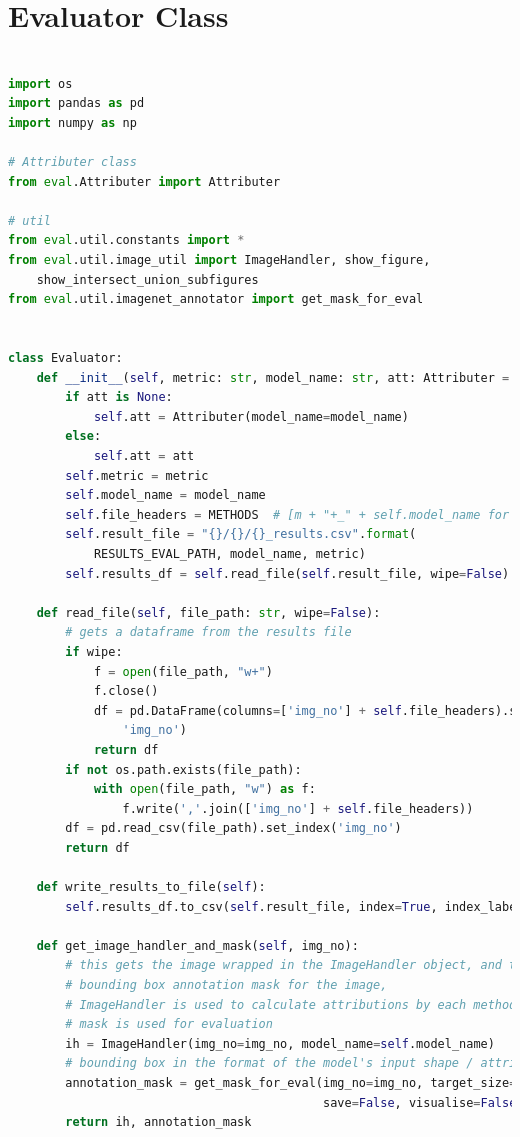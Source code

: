 \documentclass[main]{subfiles}
\begin{document}
\newpage
\chapter{Evaluator Class}

\begin{lstlisting}[language=Python,basicstyle=\scriptsize]

import os
import pandas as pd
import numpy as np

# Attributer class
from eval.Attributer import Attributer

# util
from eval.util.constants import *
from eval.util.image_util import ImageHandler, show_figure, 
	show_intersect_union_subfigures
from eval.util.imagenet_annotator import get_mask_for_eval


class Evaluator:
    def __init__(self, metric: str, model_name: str, att: Attributer = None):
        if att is None:
            self.att = Attributer(model_name=model_name)
        else:
            self.att = att
        self.metric = metric
        self.model_name = model_name
        self.file_headers = METHODS  # [m + "+_" + self.model_name for m in METHODS]
        self.result_file = "{}/{}/{}_results.csv".format(
            RESULTS_EVAL_PATH, model_name, metric)
        self.results_df = self.read_file(self.result_file, wipe=False)

    def read_file(self, file_path: str, wipe=False):
        # gets a dataframe from the results file
        if wipe:
            f = open(file_path, "w+")
            f.close()
            df = pd.DataFrame(columns=['img_no'] + self.file_headers).set_index(
                'img_no')
            return df
        if not os.path.exists(file_path):
            with open(file_path, "w") as f:
                f.write(','.join(['img_no'] + self.file_headers))
        df = pd.read_csv(file_path).set_index('img_no')
        return df

    def write_results_to_file(self):
        self.results_df.to_csv(self.result_file, index=True, index_label='img_no')

    def get_image_handler_and_mask(self, img_no):
        # this gets the image wrapped in the ImageHandler object, and the 
        # bounding box annotation mask for the image,
        # ImageHandler is used to calculate attributions by each method, and the
        # mask is used for evaluation
        ih = ImageHandler(img_no=img_no, model_name=self.model_name)
        # bounding box in the format of the model's input shape / attribution shape
        annotation_mask = get_mask_for_eval(img_no=img_no, target_size=ih.get_size(),
                                            save=False, visualise=False)
        return ih, annotation_mask


\end{lstlisting}
\end{document}

